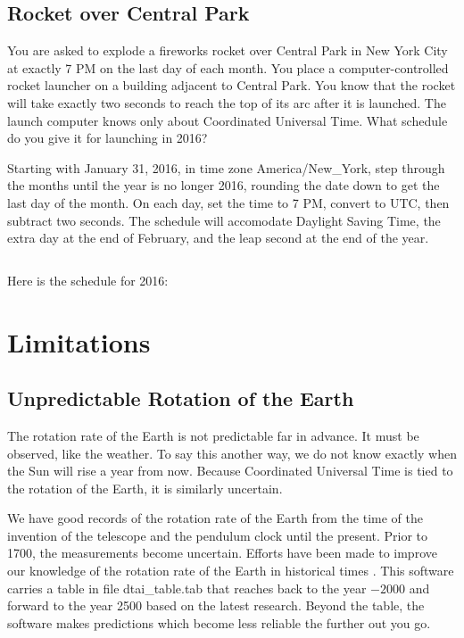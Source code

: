 \documentclass[letterpaper,twoside]{article}
\begin{document}
\subsection{Rocket over Central Park}
You are asked to explode a fireworks rocket over Central
Park in New York City at exactly 7 PM on the last day of each month.
You place a computer-controlled
rocket launcher on a building adjacent to Central Park.  You know that
the rocket will take exactly two seconds to reach the top of its
arc after it is launched.  The launch computer knows only about Coordinated
Universal Time.  What schedule do you give it for launching in 2016?

Starting with January 31, 2016, in time zone America/New\_York,
step through the months until the year is no longer 2016, rounding
the date down to get the last day of the month.
On each day, set the time to 7 PM, convert to UTC, then subtract
two seconds.  The schedule will accomodate Daylight Saving Time,
the extra day at the end of February,
and the leap second at the end of the year.
\inputminted[firstline=45,lastline=81]{c}{example_03.c}

Here is the schedule for 2016:


\section{Limitations}
\subsection{Unpredictable Rotation of the Earth}
The rotation rate of the Earth is not predictable far in advance.  It must
be observed, like the weather.  To say this another way, we do not know
exactly when the Sun will rise a year from now.  Because Coordinated
Universal Time is tied to the rotation of the Earth, it is similarly
uncertain.

We have good records of the rotation rate of the Earth from the time
of the invention of the telescope and the pendulum clock until
the present.  Prior to 1700, the measurements become uncertain.
Efforts have been made to improve our knowledge of the rotation
rate of the Earth in historical times\citep{2004JHA....35..327M}%
\citep{2005JHA....36..339M}\citep{1997A&A...322..347S}%
\citep{2011ASSP...23....3S}\citep{1986PEPI...44..281M}%
\citep{Stephenson20160404}.
This software carries a table in file {\ttfamily dtai\_table.tab}
that reaches back to the year $-2000$ and forward to
the year \num{2500} based on the latest research.
Beyond the table, the software makes predictions which become less
reliable the further out you go.
\end{document}
